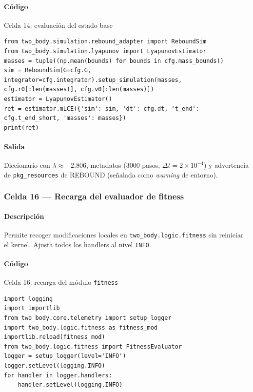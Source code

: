 \paragraph{Código}
\begin{listing}[H]
\caption{Celda 14: evaluación del estado base}
\label{lst:c04_cell14}
\begin{adjustbox}{max width=\textwidth}
\begin{minipage}{\textwidth}
\begin{verbatim}
from two_body.simulation.rebound_adapter import ReboundSim
from two_body.simulation.lyapunov import LyapunovEstimator
masses = tuple((np.mean(bounds) for bounds in cfg.mass_bounds))
sim = ReboundSim(G=cfg.G, integrator=cfg.integrator).setup_simulation(masses, cfg.r0[:len(masses)], cfg.v0[:len(masses)])
estimator = LyapunovEstimator()
ret = estimator.mLCE({'sim': sim, 'dt': cfg.dt, 't_end': cfg.t_end_short, 'masses': masses})
print(ret)
\end{verbatim}
\end{minipage}
\end{adjustbox}
\end{listing}
\paragraph{Salida} Diccionario con $\lambda \approx -2.806$, metadatos (3000 pasos, $\Delta t = 2\times10^{-4}$) y advertencia de \texttt{pkg\_resources} de REBOUND (señalada como \emph{warning} de entorno).

\subsubsection*{Celda 16 — Recarga del evaluador de fitness}
\paragraph{Descripción} Permite recoger modificaciones locales en \texttt{two\_body.logic.fitness} sin reiniciar el kernel. Ajusta todos los handlers al nivel \texttt{INFO}.
\paragraph{Código}
\begin{listing}[H]
\caption{Celda 16: recarga del módulo \texttt{fitness}}
\label{lst:c04_cell16}
\begin{adjustbox}{max width=\textwidth}
\begin{minipage}{\textwidth}
\begin{verbatim}
import logging
import importlib
from two_body.core.telemetry import setup_logger
import two_body.logic.fitness as fitness_mod
importlib.reload(fitness_mod)
from two_body.logic.fitness import FitnessEvaluator
logger = setup_logger(level='INFO')
logger.setLevel(logging.INFO)
for handler in logger.handlers:
    handler.setLevel(logging.INFO)
\end{verbatim}
\end{minipage}
\end{adjustbox}
\end{listing}
